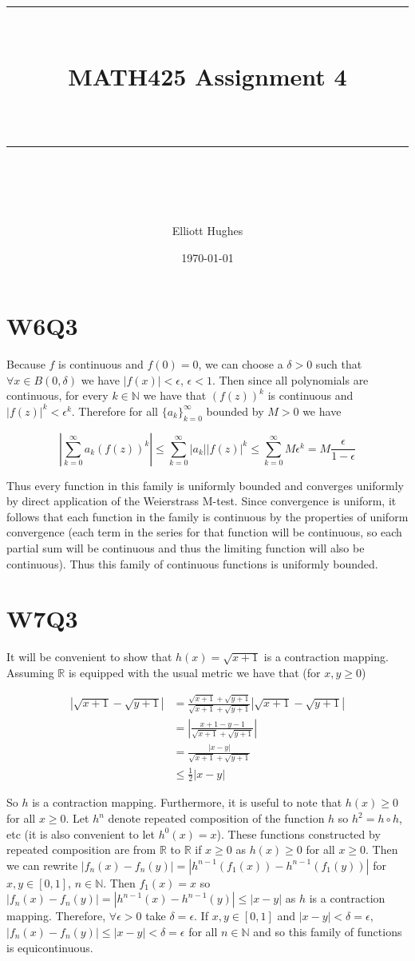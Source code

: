 \documentclass{article}
\title{	
	\normalfont\normalsize 
	\rule{\linewidth}{0.5pt}\\ %
	\vspace{14pt} %
	{\LARGE MATH425 Assignment 4\\ %
    \large \textit{} \\}
	\vspace{6pt} %
	\rule{\linewidth}{1pt}\\ %
}
\author{Elliott Hughes}
\date{\normalsize\today}
\begin{document}
\maketitle

\section*{W6Q3}
Because $f$ is continuous and $f(0) = 0$, we can choose a $\delta > 0$ such that $\forall x \in B(0,\delta)$ 
we have $|f(x)| < \epsilon$, $\epsilon < 1$. Then since all polynomials are continuous, for 
every $k \in \mathbb{N}$ we have that $(f(z))^k$ is continuous and $|f(z)|^k < \epsilon^k$. 
Therefore for all $\{a_k\}_{k=0}^\infty$ bounded by $M > 0$ we have

\begin{equation*}
    \left|\sum_{k=0}^\infty a_k(f(z))^k\right| \leq \sum^\infty_{k=0}|a_k||f(z)|^k \leq \sum_{k=0}^\infty M\epsilon^k = M\frac{\epsilon}{1-\epsilon}
\end{equation*}

Thus every function in this family is uniformly bounded and converges uniformly by direct application 
of the Weierstrass M-test. Since convergence is uniform, it follows that each function in the family 
is continuous by the properties of uniform convergence (each term in the series for that function will be continuous, so each 
partial sum will be continuous and thus the limiting function will also be continuous). Thus this family of continuous functions is 
uniformly bounded.


\section*{W7Q3}
It will be convenient to show that $h(x) = \sqrt{x + 1}$ is a contraction mapping. Assuming $\mathbb{R}$ 
is equipped with the usual metric we have that (for $x,y \geq 0$) 

\begin{align*}
	|\sqrt{x+1} - \sqrt{y+1}| &= \frac{\sqrt{x+1} + \sqrt{y+1}}{\sqrt{x+1} + \sqrt{y+1}}|\sqrt{x+1} - \sqrt{y+1}| \\
	& = \left|\frac{x+1 -y - 1}{\sqrt{x+1} + \sqrt{y+1}}\right| \\
	&= \frac{|x-y|}{\sqrt{x+1} + \sqrt{y+1}} \\
	& \leq \frac{1}{2}|x-y|
\end{align*}

So $h$ is a contraction mapping. Furthermore, it is useful to note that $h(x) \geq 0$ for all $x \geq 0$. 
Let $h^n$ denote repeated composition of the function $h$ so $h^2 = h \circ h$, etc (it is also 
convenient to let $h^0(x) = x$). These functions constructed by repeated composition are from $\mathbb{R}$ to $\mathbb{R}$ if $x \geq 0$ as $h(x) \geq 0$ 
for all $x \geq 0$. Then 
we can rewrite $|f_n(x) - f_n(y)| = |h^{n-1}(f_1(x)) - h^{n-1}(f_1(y))|$ for $x,y \in [0,1]$, $n \in \mathbb{N}$. 
Then $f_1(x) = x$ so $|f_n(x) - f_n(y)| = |h^{n-1}(x) - h^{n-1}(y)| \leq |x-y|$ as $h$ is a 
contraction mapping. Therefore, $\forall \epsilon > 0$ take $\delta = \epsilon$. If $x,y \in [0,1]$ and 
$|x-y| < \delta = \epsilon$, $|f_n(x) - f_n(y)| \leq |x-y| < \delta = \epsilon$ for all $n \in \mathbb{N}$ 
and so this family of functions is equicontinuous.
\end{document}
